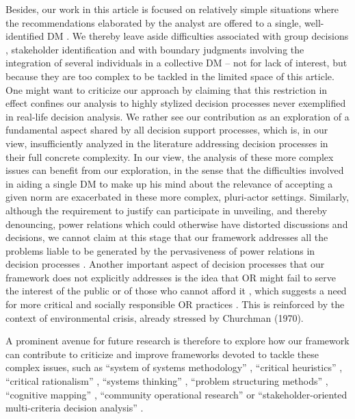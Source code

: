 \documentclass[preprint, french, english, 11pt, authoryear]{elsarticle}%
\begin{document}
Besides, our work in this article is focused on relatively simple situations where the recommendations elaborated by the analyst are offered to a single, well-identified DM%
.
We thereby leave aside difficulties associated with group decisions \citep{jackson_towards_1984}, stakeholder identification \citep{wang_systemic_2015} and with boundary judgments involving the integration of several individuals in a collective DM%
 \citep{midgley_systemic_2000}
-- not for lack of interest, but because they are too complex to be tackled in the limited space of this article. One might want to criticize our approach by claiming that this restriction in effect confines our analysis to highly stylized decision processes never exemplified in real-life decision analysis.
We rather see our contribution as an exploration of a fundamental aspect shared by all decision support processes, which is, in our view, insufficiently analyzed in the literature addressing decision processes in their full concrete complexity.
In our view, the analysis of these more complex issues can benefit from our exploration, in the sense that the difficulties involved in aiding a single DM%
 to make up his mind about the relevance of accepting a given norm are exacerbated in these more complex, pluri-actor settings. 
Similarly, although the requirement to justify can participate in unveiling, and thereby denouncing, power relations which could otherwise have distorted discussions and decisions, 
we cannot claim at this stage that our framework addresses all the problems liable to be generated by the pervasiveness of power relations in decision processes \citep{cronin_issues_2014}.
Another important aspect of decision processes that our framework does not explicitly addresses is the idea that OR%
 might fail to serve the interest of the public or of those who cannot afford it \citep{rosenhead_report_1986}, 
which suggests a need for more critical and socially responsible OR practices \citep{jackson_systems_2000,ulrich_beyond_2003}. This is reinforced by the context of environmental crisis, already stressed by Churchman (1970).

A prominent avenue for future research is therefore to explore how our framework can contribute to criticize and improve frameworks devoted to tackle these complex issues, such as ``system of systems methodology'' \citep{jackson_towards_1984}, ``critical heuristics'' \citep{ulrich_critical_1987}, 
``critical rationalism'' \citep{ormerod_critical_2014}, ``systems thinking'' \citep{mingers_review_2010}, ``problem structuring methods'' \citep{hector_problem-structuring_2009}, ``cognitive mapping'' \citep{eden_analyzing_2004}, ``community operational research'' \citep{johnson_emerging_2018} or 
``stakeholder-oriented multi-criteria decision analysis'' \citep{de_brucker_multi-criteria_2013}. 
\end{document}
